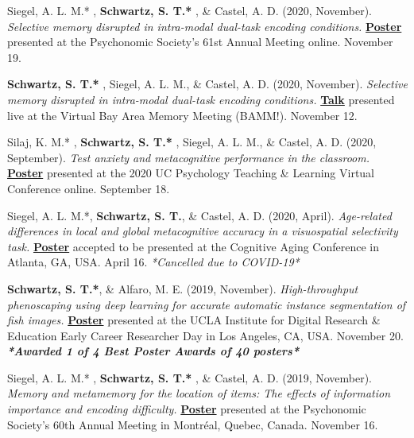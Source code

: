 \pubspace

Siegel, A. L. M.* \dag, \textbf{Schwartz, S. T.* \dag}, \& Castel, A. D. (2020, November). \textit{Selective memory disrupted in intra-modal dual-task encoding conditions.} \textbf{\underline{Poster}} presented at the Psychonomic Society's 61st Annual Meeting online. November 19.

\pubspace

\textbf{Schwartz, S. T.* \dag}, Siegel, A. L. M.\dag, \& Castel, A. D. (2020, November). \textit{Selective memory disrupted in intra-modal dual-task encoding conditions.} \textbf{\underline{Talk}} presented live at the Virtual Bay Area Memory Meeting (BAMM!). November 12.

\pubspace

Silaj, K. M.* \dag, \textbf{Schwartz, S. T.* \dag}, Siegel, A. L. M., \& Castel, A. D. (2020, September). \textit{Test anxiety and metacognitive performance in the classroom.} \textbf{\underline{Poster}} presented at the 2020 UC Psychology Teaching \& Learning Virtual Conference online. September 18.

\pubspace

Siegel, A. L. M.*, \textbf{Schwartz, S. T.}, \& Castel, A. D. (2020, April). \textit{Age-related differences in local and global metacognitive accuracy in a visuospatial selectivity task.} \textbf{\underline{Poster}} accepted to be presented at the Cognitive Aging Conference in Atlanta, GA, USA. April 16. \textit{*Cancelled due to COVID-19*}

\pubspace

\textbf{Schwartz, S. T.*}, \& Alfaro, M. E. (2019, November). \textit{High-throughput phenoscaping using deep learning for accurate automatic instance segmentation of fish images.} \textbf{\underline{Poster}} presented at the UCLA Institute for Digital Research \& Education Early Career Researcher Day in Los Angeles, CA, USA. November 20. \textbf{\textit{*Awarded 1 of 4 Best Poster Awards of 40 posters*}}

\pubspace

Siegel, A. L. M.* \dag, \textbf{Schwartz, S. T.* \dag}, \& Castel, A. D. (2019, November). \textit{Memory and metamemory for the location of items: The effects of information importance and encoding difficulty.} \textbf{\underline{Poster}} presented at the Psychonomic Society's 60th Annual Meeting in Montr\'eal, Quebec, Canada. November 16.

\pubspace

